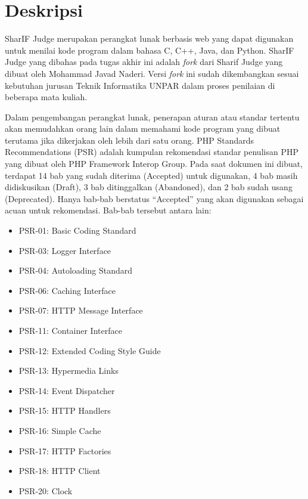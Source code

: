 \documentclass[a4paper,twoside]{article}
\begin{document}
	
	\title{\@judultopik}
	\author{\nama \textendash \@npm} 
	
	\newcommand{\nama}{Nicholas Khrisna Sandyawan}
	\newcommand{\@npm}{6181801060}
	\newcommand{\@judultopik}{Evaluasi PHP Standards Recommendations pada proyek SharIF Judge} %
	\newcommand{\jumpemb}{1} %
	\newcommand{\tanggal}{27/09/2023}
	
	
	\maketitle
	
	
	\section{Deskripsi}
	SharIF Judge merupakan perangkat lunak berbasis web yang dapat digunakan untuk menilai kode program dalam bahasa C, C++, Java, dan Python. SharIF Judge yang dibahas pada tugas akhir ini adalah \textit{fork} dari Sharif Judge yang dibuat oleh Mohammad Javad Naderi. Versi \textit{fork} ini sudah dikembangkan sesuai kebutuhan jurusan Teknik Informatika UNPAR dalam proses penilaian di beberapa mata kuliah.
	
	Dalam pengembangan perangkat lunak, penerapan aturan atau standar tertentu akan memudahkan orang lain dalam memahami kode program yang dibuat terutama jika dikerjakan oleh lebih dari satu orang. PHP Standards Recommendations (PSR) adalah kumpulan rekomendasi standar penulisan PHP yang dibuat oleh PHP Framework Interop Group. Pada saat dokumen ini dibuat, terdapat 14 bab yang sudah diterima (Accepted) untuk digunakan, 4 bab masih didiskusikan (Draft), 3 bab ditinggalkan (Abandoned), dan 2 bab sudah usang (Deprecated). Hanya bab-bab  berstatus ``Accepted'' yang akan digunakan sebagai acuan untuk rekomendasi. Bab-bab tersebut antara lain: 
	\begin{itemize}
		\item PSR-01: Basic Coding Standard
		\item PSR-03: Logger Interface
		\item PSR-04: Autoloading Standard
		\item PSR-06: Caching Interface
		\item PSR-07: HTTP Message Interface
		\item PSR-11: Container Interface
		\item PSR-12: Extended Coding Style Guide
		\item PSR-13: Hypermedia Links
		\item PSR-14: Event Dispatcher
		\item PSR-15: HTTP Handlers
		\item PSR-16: Simple Cache
		\item PSR-17: HTTP Factories
		\item PSR-18: HTTP Client
		\item PSR-20: Clock
	\end{itemize}
	
\end{document}
